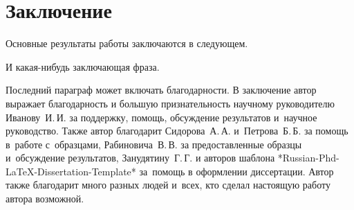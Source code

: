 \chapter*{Заключение}                       %


Основные результаты работы заключаются в следующем.

И какая-нибудь заключающая фраза.

Последний параграф может включать благодарности.  В заключение автор
выражает благодарность и большую признательность научному руководителю
Иванову~И.\,И. за поддержку, помощь, обсуждение результатов и~научное
руководство. Также автор благодарит Сидорова~А.\,А. и~Петрова~Б.\,Б.
за помощь в~работе с~образцами, Рабиновича~В.\,В. за предоставленные
образцы и~обсуждение результатов, Занудятину~Г.\,Г. и авторов шаблона
*Russian-Phd-LaTeX-Dissertation-Template* за~помощь в оформлении
диссертации. Автор также благодарит много разных людей
и~всех, кто сделал настоящую работу автора возможной.
